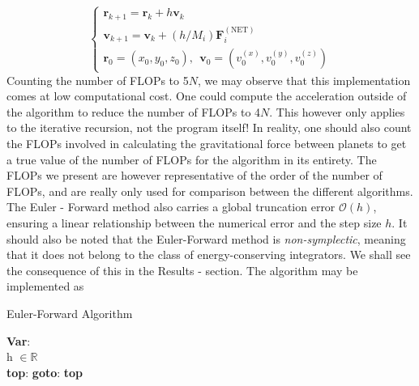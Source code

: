 	\begin{equation}
		\begin{cases}
		\mathbf{r}_{k+1} = \mathbf{r}_k + h\mathbf{v}_k\\
		\mathbf{v}_{k+1} = \mathbf{v}_k + (h/M_i)\mathbf{F}^{(\text{NET})}_i\\
		\mathbf{r}_0 = (x_0, y_0,z_0),\ \ \mathbf{v}_0 = (v^{(x)}_0, v^{(y)}_0,v^{(z)}_0)
		\end{cases}
		\label{eulerforward}
	\end{equation}
	Counting the number of FLOPs to 5$N$, we may observe that this implementation comes at low computational cost. One could compute the acceleration outside of the algorithm to reduce the number of FLOPs to 4$N$. This however only applies to the iterative recursion, not the program itself! In reality, one should also count the FLOPs involved in calculating the gravitational force between planets to get a true value of the number of FLOPs for the algorithm in its entirety. The FLOPs we present are however representative of the order of the number of FLOPs, and are really only used for comparison between the different algorithms. The Euler - Forward method also carries a global truncation error $\mathcal{O}(h)$, ensuring a linear relationship between the numerical error and the step size $h$. It should also be noted that the Euler-Forward method is \textit{non-symplectic}, meaning that it does not belong to the class of energy-conserving integrators. We shall see the consequence of this in the Results - section. The algorithm may be implemented as\\
	
	
	\begin{algorithm}[H]
		\caption{Euler-Forward Algorithm}
		\label{algoEF}
		\SetAlgoLined
		
		\textbf{Var}:\\
		h $\in \mathbb{R}$\\
		\textbf{top}:	
		\newline
	\textbf{goto}: \textbf{top}
	\end{algorithm}
	

